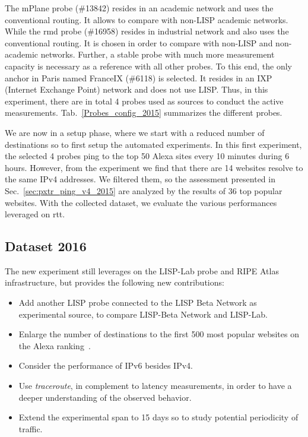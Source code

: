 The mPlane probe (\#13842) resides in an academic network and uses the conventional routing. It allows to compare with non-LISP academic networks. While the rmd probe (\#16958) resides in industrial network and also uses the conventional routing. It is chosen in order to compare with non-LISP and non-academic networks. Further, a stable probe with much more measurement capacity is necessary as a reference with all other probes. To this end, the only anchor in Paris named FranceIX (\#6118) is selected. It resides in an IXP (Internet Exchange Point) network and does not use LISP. Thus, in this experiment, there are in total 4 probes used as sources to conduct the active measurements. Tab.~\ref{Probes_config_2015} summarizes the different probes.

We are now in a setup phase, where we start with a reduced number of destinations so to first setup the automated experiments. In this first experiment, the selected 4 probes ping to the top 50 Alexa sites every 10 minutes during 6 hours. However, from the experiment we find that there are 14 websites resolve to the same IPv4 addresses. We filtered them, so the assessment presented in Sec.~\ref{sec:pxtr_ping_v4_2015} are analyzed by the results of 36 top popular websites. With the collected dataset, we evaluate the various performances leveraged on \acrshort{rtt}.

\subsection{Dataset 2016}
\label{sec:pxtr_meth_2016}
The new experiment still leverages on the LISP-Lab probe and RIPE Atlas infrastructure, but provides the following new contributions:
\begin{itemize}[noitemsep,topsep=0pt]
    \item Add another LISP probe connected to the LISP Beta Network as experimental source, to compare LISP-Beta Network and LISP-Lab.
    \item Enlarge the number of destinations to the first 500 most popular websites on the Alexa ranking~\cite{alexa}.
    \item Consider the performance of IPv6 besides IPv4.
    \item Use \emph{traceroute}, in complement to latency measurements, in order to have a deeper understanding of the observed behavior.
    \item Extend the experimental span to 15 days so to study potential periodicity of traffic.
\end{itemize}


